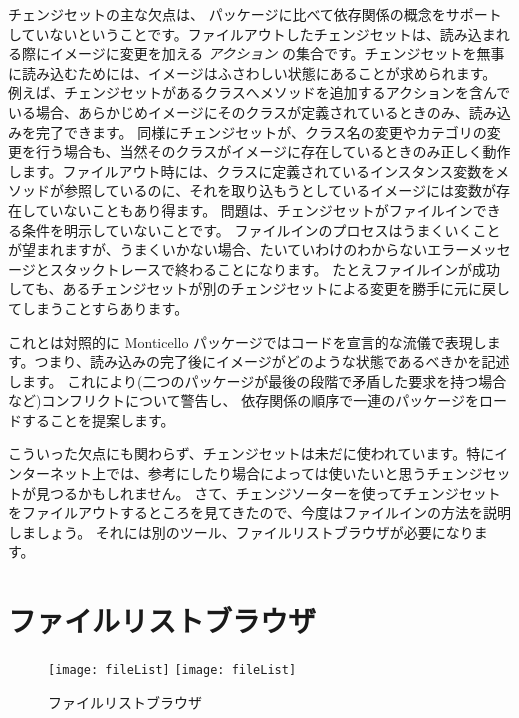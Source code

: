 \documentclass[a4paper,10pt,twoside]{book}
\begin{document}
チェンジセットの主な欠点は、 パッケージに比べて依存関係の概念をサポートしていないということです。ファイルアウトしたチェンジセットは、読み込まれる際にイメージに変更を加える \emph{アクション} の集合です。チェンジセットを無事に読み込むためには、イメージはふさわしい状態にあることが求められます。
例えば、チェンジセットがあるクラスへメソッドを追加するアクションを含んでいる場合、あらかじめイメージにそのクラスが定義されているときのみ、読み込みを完了できます。
同様にチェンジセットが、クラス名の変更やカテゴリの変更を行う場合も、当然そのクラスがイメージに存在しているときのみ正しく動作します。ファイルアウト時には、クラスに定義されているインスタンス変数をメソッドが参照しているのに、それを取り込もうとしているイメージには変数が存在していないこともあり得ます。
問題は、チェンジセットがファイルインできる条件を明示していないことです。
ファイルインのプロセスはうまくいくことが望まれますが、うまくいかない場合、たいていわけのわからないエラーメッセージとスタックトレースで終わることになります。
たとえファイルインが成功しても、あるチェンジセットが別のチェンジセットによる変更を勝手に元に戻してしまうことすらあります。

これとは対照的に Monticello パッケージではコードを宣言的な流儀で表現します。つまり、読み込みの完了後にイメージがどのような状態であるべきかを記述します。
これにより(二つのパッケージが最後の段階で矛盾した要求を持つ場合など)コンフリクトについて警告し、
依存関係の順序で一連のパッケージをロードすることを提案します。

こういった欠点にも関わらず、チェンジセットは未だに使われています。特にインターネット上では、参考にしたり場合によっては使いたいと思うチェンジセットが見つるかもしれません。
さて、チェンジソーターを使ってチェンジセットをファイルアウトするところを見てきたので、今度はファイルインの方法を説明しましょう。
それには別のツール、ファイルリストブラウザが必要になります。


\section{ファイルリストブラウザ}

\begin{figure}[btp]
\begin{center}
\ifluluelse
{\texttt{[image: fileList]}}
{\texttt{[image: fileList]}}
\end{center}
\caption{ファイルリストブラウザ}
\end{figure}
\end{document}
